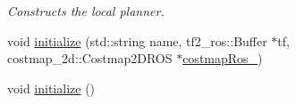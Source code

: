 \begin{DoxyCompactItemize}
\begin{DoxyCompactList}\small\item\em Constructs the local planner. \end{DoxyCompactList}\item 
void \hyperlink{classmove__base__z__client_1_1backward__local__planner_1_1BackwardLocalPlanner_ad31278d3b0f2d990c5e5fe440809c864}{initialize} (std\+::string name, tf2\+\_\+ros\+::\+Buffer $\ast$tf, costmap\+\_\+2d\+::\+Costmap2\+D\+R\+OS $\ast$\hyperlink{classmove__base__z__client_1_1backward__local__planner_1_1BackwardLocalPlanner_a865618f84238fe6ff437d1e38ec5fec0}{costmap\+Ros\+\_\+})
\item 
void \hyperlink{classmove__base__z__client_1_1backward__local__planner_1_1BackwardLocalPlanner_acdb083587fd77dc2c8d617751ac08f74}{initialize} ()
\end{DoxyCompactItemize}
